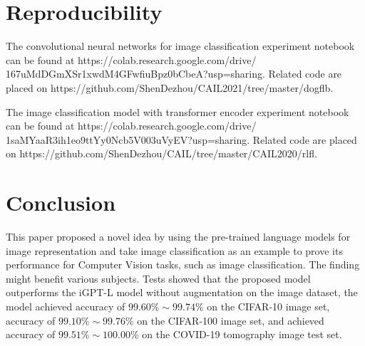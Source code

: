 \documentclass[runningheads]{llncs}
\begin{document}
\section{Reproducibility}

The convolutional neural networks for image classification experiment notebook can be found at https://colab.research.google.com/drive/\\
167uMdDGmXSr1xwdM4GFwfiuBpz0bCbeA?usp=sharing. Related code are placed on https://github.com/ShenDezhou/CAIL2021/tree/master/dogflb.

The image classification model with transformer encoder experiment notebook can be found at https://colab.research.google.com/drive/\\
1saMYaaR3ih1eo9ttYy0Ncb5V003uVyEV?usp=sharing. Related code are placed on https://github.com/ShenDezhou/CAIL/tree/master/CAIL2020/rlfl.



\section{Conclusion}

 This paper proposed a novel idea by using the pre-trained language models for image representation and take image classification
 as an example to prove its performance for Computer Vision tasks, such as image classification.
 The finding might benefit various subjects.
Tests showed that the proposed model outperforms the iGPT-L model without augmentation on the image dataset,
the model achieved accuracy of $99.60\%\sim99.74\%$ on the CIFAR-10 image set,
accuracy of $99.10\%\sim99.76\%$ on the CIFAR-100 image set, and achieved accuracy of $99.51\%\sim100.00\%$ on the COVID-19 tomography image test set.

%
%
%
% 
% 
%
{\small



}
\end{document}
